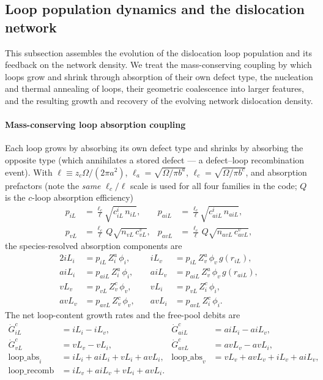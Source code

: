 \documentclass{article}
\begin{document}
\subsection{Loop population dynamics and the dislocation network}
This subsection assembles the evolution of the dislocation loop population and its feedback on the network density. We treat the mass-conserving coupling by which loops grow and shrink through absorption of their own defect type, the nucleation and thermal annealing of loops, their geometric coalescence into larger features, and the resulting growth and recovery of the evolving network dislocation density.

\paragraph{Mass-conserving loop absorption coupling}\label{sec:loopcoupling}
Each loop grows by absorbing its own defect type and shrinks by absorbing the
opposite type (which annihilates a stored defect — a defect--loop
recombination event). With $\ell\equiv z_c\Omega/(2\pi a^2)$,
$\ell_a=\sqrt{\Omega/\pi b^a}$, $\ell_c=\sqrt{\Omega/\pi b^c}$, and absorption
prefactors (note the \emph{same} $\ell_c/\ell$ scale is used for all four
families in the code; $Q$ is the $c$-loop absorption efficiency)
\begin{align}
p_{iL} &=\frac{\ell_c}{\ell}\sqrt{c_{iL}^{i}\,n_{iL}}, &
p_{aiL}&=\frac{\ell_c}{\ell}\sqrt{c_{aiL}^{i}\,n_{aiL}},\\
p_{vL} &=\frac{\ell_c}{\ell}\,Q\sqrt{n_{vL}\,c_{vL}^{v}}, &
p_{avL}&=\frac{\ell_c}{\ell}\,Q\sqrt{n_{avL}\,c_{avL}^{v}},
\end{align}
the species-resolved absorption components are
\begin{alignat}{2}
iL_i  &= p_{iL}\,Z_i^{a}\,\phi_i, &\quad
iL_v  &= p_{iL}\,Z_v^{a}\,\phi_v\,g(r_{iL}),\\
aiL_i &= p_{aiL}\,Z_i^{a}\,\phi_i, &\quad
aiL_v &= p_{aiL}\,Z_v^{a}\,\phi_v\,g(r_{aiL}),\\
vL_v  &= p_{vL}\,Z_v^{c}\,\phi_v, &\quad
vL_i  &= p_{vL}\,Z_i^{c}\,\phi_i,\\
avL_v &= p_{avL}\,Z_v^{c}\,\phi_v, &\quad
avL_i &= p_{avL}\,Z_i^{c}\,\phi_i.
\end{alignat}
The net loop-content growth rates and the free-pool debits are
\begin{align}
\dot{G}_{iL}^{c}&=iL_i-iL_v, &
\dot{G}_{aiL}^{c}&=aiL_i-aiL_v,\\
\dot{G}_{vL}^{c}&=vL_v-vL_i, &
\dot{G}_{avL}^{c}&=avL_v-avL_i,\\
\text{loop\_abs}_i &= iL_i+aiL_i+vL_i+avL_i, &
\text{loop\_abs}_v &= vL_v+avL_v+iL_v+aiL_v, \\
\text{loop\_recomb} &= iL_v+aiL_v+vL_i+avL_i. 
\end{align}
\end{document}

